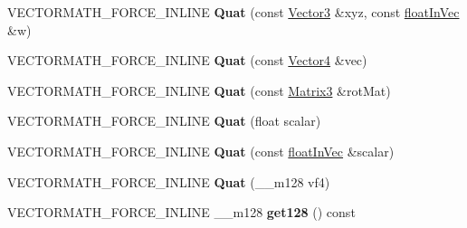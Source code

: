 \begin{DoxyCompactItemize}
\item 
\hypertarget{class_vectormath_1_1_aos_1_1_quat_a579880f622f65e2e6cf6e65ca3f12794}{V\+E\+C\+T\+O\+R\+M\+A\+T\+H\+\_\+\+F\+O\+R\+C\+E\+\_\+\+I\+N\+L\+I\+N\+E {\bfseries Quat} (const \hyperlink{class_vectormath_1_1_aos_1_1_vector3}{Vector3} \&xyz, const \hyperlink{class_vectormath_1_1float_in_vec}{float\+In\+Vec} \&w)}\label{class_vectormath_1_1_aos_1_1_quat_a579880f622f65e2e6cf6e65ca3f12794}

\item 
\hypertarget{class_vectormath_1_1_aos_1_1_quat_a60356545117438d21499d0afd7d689da}{V\+E\+C\+T\+O\+R\+M\+A\+T\+H\+\_\+\+F\+O\+R\+C\+E\+\_\+\+I\+N\+L\+I\+N\+E {\bfseries Quat} (const \hyperlink{class_vectormath_1_1_aos_1_1_vector4}{Vector4} \&vec)}\label{class_vectormath_1_1_aos_1_1_quat_a60356545117438d21499d0afd7d689da}

\item 
\hypertarget{class_vectormath_1_1_aos_1_1_quat_a6ee788faa20607fe4c9823ef2065c689}{V\+E\+C\+T\+O\+R\+M\+A\+T\+H\+\_\+\+F\+O\+R\+C\+E\+\_\+\+I\+N\+L\+I\+N\+E {\bfseries Quat} (const \hyperlink{class_vectormath_1_1_aos_1_1_matrix3}{Matrix3} \&rot\+Mat)}\label{class_vectormath_1_1_aos_1_1_quat_a6ee788faa20607fe4c9823ef2065c689}

\item 
\hypertarget{class_vectormath_1_1_aos_1_1_quat_ab3080be7cc946bf0fe1388155d3df50a}{V\+E\+C\+T\+O\+R\+M\+A\+T\+H\+\_\+\+F\+O\+R\+C\+E\+\_\+\+I\+N\+L\+I\+N\+E {\bfseries Quat} (float scalar)}\label{class_vectormath_1_1_aos_1_1_quat_ab3080be7cc946bf0fe1388155d3df50a}

\item 
\hypertarget{class_vectormath_1_1_aos_1_1_quat_a121d29b49a881a553de03b7df07e0c6f}{V\+E\+C\+T\+O\+R\+M\+A\+T\+H\+\_\+\+F\+O\+R\+C\+E\+\_\+\+I\+N\+L\+I\+N\+E {\bfseries Quat} (const \hyperlink{class_vectormath_1_1float_in_vec}{float\+In\+Vec} \&scalar)}\label{class_vectormath_1_1_aos_1_1_quat_a121d29b49a881a553de03b7df07e0c6f}

\item 
\hypertarget{class_vectormath_1_1_aos_1_1_quat_af62400c0f8225b7d63abd214f63afb88}{V\+E\+C\+T\+O\+R\+M\+A\+T\+H\+\_\+\+F\+O\+R\+C\+E\+\_\+\+I\+N\+L\+I\+N\+E {\bfseries Quat} (\+\_\+\+\_\+m128 vf4)}\label{class_vectormath_1_1_aos_1_1_quat_af62400c0f8225b7d63abd214f63afb88}

\item 
\hypertarget{class_vectormath_1_1_aos_1_1_quat_a14358028e678b014cd538db8f36766fe}{V\+E\+C\+T\+O\+R\+M\+A\+T\+H\+\_\+\+F\+O\+R\+C\+E\+\_\+\+I\+N\+L\+I\+N\+E \+\_\+\+\_\+m128 {\bfseries get128} () const }\label{class_vectormath_1_1_aos_1_1_quat_a14358028e678b014cd538db8f36766fe}


\end{DoxyCompactItemize}
